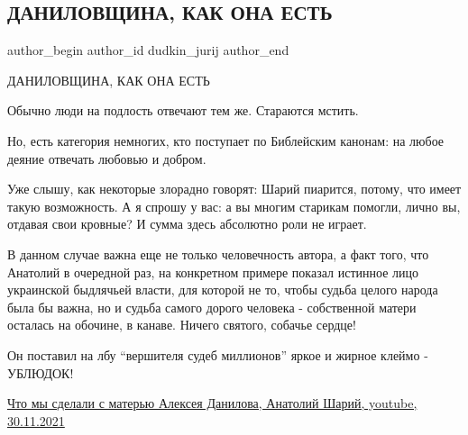  
 
 
 
 
 
\subsection{ДАНИЛОВЩИНА, КАК ОНА ЕСТЬ}
\label{sec:30_11_2021.fb.dudkin_jurij.1.danilovschina}
 
\ifcmt
 author_begin
   author_id dudkin_jurij
 author_end
\fi

ДАНИЛОВЩИНА, КАК ОНА ЕСТЬ

Обычно люди на подлость отвечают тем же. Стараются мстить.

Но, есть категория немногих, кто поступает по Библейским канонам: на любое
деяние отвечать любовью и добром.

Уже слышу, как некоторые злорадно говорят: Шарий пиарится, потому, что имеет
такую возможность. А я спрошу у вас: а вы многим старикам помогли, лично вы,
отдавая свои кровные? И сумма здесь абсолютно роли не играет.

В данном случае важна еще не только человечность автора, а факт того, что
Анатолий в очередной раз, на конкретном примере показал истинное лицо
украинской быдлячьей власти, для которой не то, чтобы судьба целого народа была
бы важна, но и судьба самого дорого человека - собственной матери осталась на
обочине, в канаве. Ничего святого, собачье сердце!

Он поставил на лбу \enquote{вершителя судеб миллионов} яркое и жирное клеймо -
УБЛЮДОК!

\href{https://youtu.be/wSJLgJM7REM}{%
Что мы сделали с матерью Алексея Данилова, Анатолий Шарий, youtube, 30.11.2021%
}

